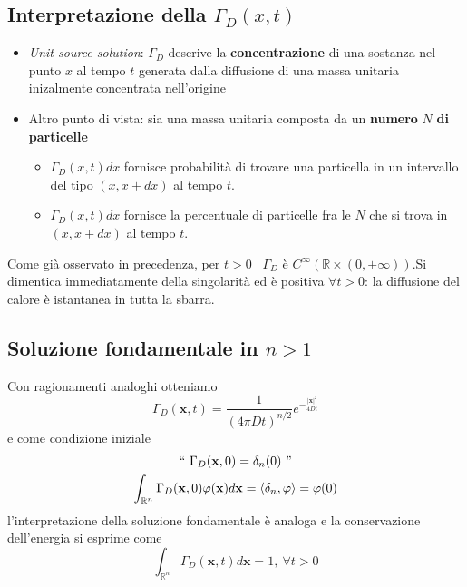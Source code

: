 \documentclass[10pt,a4paper,twoside,openright]{book}
\begin{document}
\subsection{Interpretazione della \texorpdfstring{$\displaystyle \Gamma _{D}(x,t)$}{soluzione}}
\begin{itemize}
\item \textit{Unit source solution}: $\displaystyle \Gamma _{D}$ descrive la \textbf{concentrazione} di una sostanza nel punto $\displaystyle x$ al tempo $\displaystyle t$ generata dalla diffusione di una massa unitaria inizalmente concentrata nell'origine
\item Altro punto di vista: sia una massa unitaria composta da un \textbf{numero }$\displaystyle N$\textbf{ di particelle}
\begin{itemize}
\item $\displaystyle \Gamma _{D}(x,t) dx$ fornisce probabilità di trovare una particella in un intervallo del tipo $\displaystyle (x,x+dx)$ al tempo $\displaystyle t$.
\item $\displaystyle \Gamma _{D}(x,t) dx$ fornisce la percentuale di particelle fra le $\displaystyle N$ che si trova in $\displaystyle (x,x+dx)$ al tempo $\displaystyle t$.
\end{itemize}
\end{itemize}
\begin{nb}
Come già osservato in precedenza, per $\displaystyle t >0$ \ $\displaystyle \Gamma _{D}$ è $\displaystyle C^{\infty }(\mathbb{R} \times (0,+\infty)) .$Si dimentica immediatamente della singolarità ed è positiva $\displaystyle \forall t >0$: la diffusione del calore è istantanea in tutta la sbarra.
\end{nb}
\subsection{Soluzione fondamentale in \texorpdfstring{$\displaystyle n >1$}{n > 1}}

Con ragionamenti analoghi otteniamo
\begin{equation*}
\Gamma _{D}(\mathbf{x},t) =\frac{1}{(4\pi Dt)^{n/2}} e^{-\frac{| \mathbf{x}| ^{2}}{4Dt}}
\end{equation*}
e come condizione iniziale
\begin{gather*}
``\ \Gamma _{D}(\mathbf{x},0) =\delta _{n}(0) \ "\\
\int _{\mathbb{R}^{n}} \Gamma _{D}(\mathbf{x},0) \varphi (\mathbf{x}) d\mathbf{x} =\langle \delta _{n},\varphi \rangle =\varphi (0)
\end{gather*}
l'interpretazione della soluzione fondamentale è analoga e la conservazione dell'energia si esprime come\begin{equation*}
\int _{\mathbb{R}^{n}} \Gamma _{D}(\mathbf{x},t) d\mathbf{x} =1,\ \forall t >0
\end{equation*}
\end{document}
